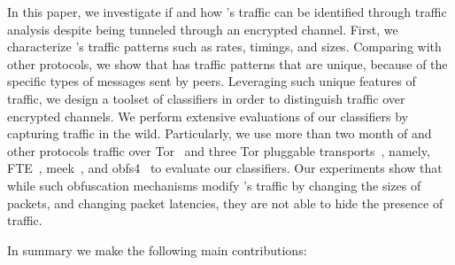 In this paper, we investigate if and how  \bc's traffic can be identified through traffic analysis despite being tunneled through an encrypted channel. 
First, we characterize \bc's traffic patterns such as rates, timings, and sizes. 
Comparing with other protocols, we show that \bc has traffic patterns that are unique, because of the specific types of messages sent by \bc peers. 
Leveraging such unique features of \bc traffic, we design a toolset of classifiers in order to distinguish \bc traffic over encrypted channels. 
We perform extensive evaluations of our classifiers by capturing \bc traffic in the wild. Particularly, we use more than two month of \bc  and other protocols traffic over Tor~\cite{tor} and three Tor pluggable transports~\cite{pluggable-transport}, namely, FTE~\cite{fte}, meek~\cite{meek}, and obfs4~\cite{obfsproxy} to evaluate our classifiers. 
Our experiments show that while such obfuscation mechanisms modify \bc's traffic by changing the sizes of packets, and changing packet latencies, they are not able to hide the presence of \bc traffic.
\begin{comment}
Our experiments show that while such obfuscation mechanisms modify \bc's traffic by changing the sizes of packets, and changing packet latencies, for each of the protocols we are able to design a reliable classifier to identify \bc traffic from other traffic. 
Our classifiers can even detect \bc traffic mixed with background traffic such as open browser tabs.

Based on our experiments, we conclude that standard obfuscation mechanisms do not do a good job in hiding Bitcoin traffic. 
This is due to a fundamental issue: Bitcoin (and all blockchain protocols we are aware of) generate of particular protocol messages with unique sizes and frequencies. To hide such unique patterns, an obfuscating protocol needs to apply significant cover traffic or apply large perturbations. 
The latter option has significant implications to the security of a cryptocurrency system.
\end{comment}

In summary we make the following main contributions:

